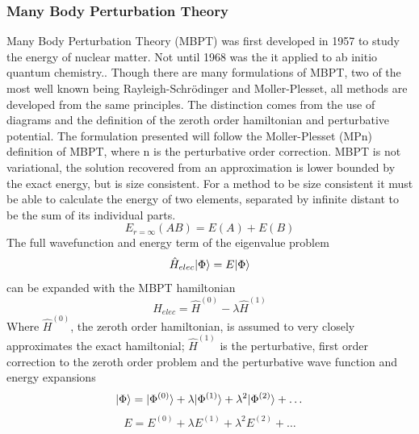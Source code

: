    \subsubsection{Many Body Perturbation Theory}
      Many Body Perturbation Theory (MBPT) was first developed in 1957\cite{Brueckner, 1955} to study the energy of nuclear matter.  Not until 1968 was the it applied to ab initio quantum chemistry.\cite{Freed 1968, Freed 1971}.  Though there are many formulations of MBPT, two of the most well known being Rayleigh-Schr{\"o}dinger\cite{Lindgren 1974} and M{\/o}ller-Plesset\cite{Moller 1934, Raghavachari 1989}, all methods are developed from the same principles.  The distinction comes from the use of diagrams and the definition of the zeroth order hamiltonian and perturbative potential.  The formulation presented will follow the M{\/o}ller-Plesset (MPn) definition of MBPT, where n is the perturbative order correction. MBPT is not variational, the solution recovered from an approximation is lower bounded by the exact energy, but is size consistent. For a method to be size consistent it must be able to calculate the energy of two elements, separated by infinite distant to be the sum of its individual parts.  
        \begin{equation}
        	E_{r=\infty}(AB) = E(A) + E(B)
        \end{equation}
      The full wavefunction and energy term of the eigenvalue problem 
        \begin{equation}
        	\hat{H}_{elec}| \Phi \rangle =  E| \Phi \rangle
        \end{equation}
      can be expanded with the MBPT hamiltonian
      \begin{equation}
      	\hat{H}_{elec} = \hat{H}^{(0)} - \lambda \hat{H}^{(1)}
      \end{equation}
      Where $\hat{H}^{(0)}$, the zeroth order hamiltonian, is assumed to very closely approximates the exact hamiltonial; $\hat{H}^{(1)}$ is the perturbative, first order correction to the zeroth order problem and the perturbative wave function and energy expansions
        \begin{equation}
        	| \Phi \rangle = | \Phi^{(0)} \rangle + \lambda | \Phi^{(1)} \rangle +  \lambda^2 | \Phi^{(2)} \rangle + \dots\\
        \end{equation}
        \begin{equation}
        	E = E^{(0)} + \lambda E^{(1)} + \lambda^2 E^{(2)} + \dots
        \end{equation}
